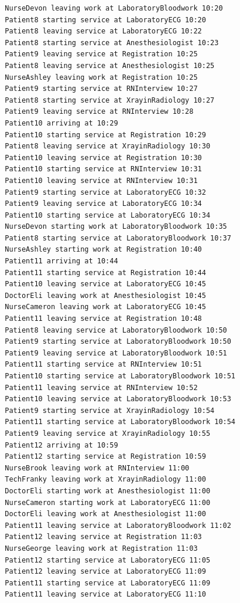\documentclass[12pt]{article}
\begin{document}
\begin{verbatim}
		NurseDevon leaving work at LaboratoryBloodwork 10:20
		Patient8 starting service at LaboratoryECG 10:20
		Patient8 leaving service at LaboratoryECG 10:22
		Patient8 starting service at Anesthesiologist 10:23
		Patient9 leaving service at Registration 10:25
		Patient8 leaving service at Anesthesiologist 10:25
		NurseAshley leaving work at Registration 10:25
		Patient9 starting service at RNInterview 10:27
		Patient8 starting service at XrayinRadiology 10:27
		Patient9 leaving service at RNInterview 10:28
		Patient10 arriving at 10:29
		Patient10 starting service at Registration 10:29
		Patient8 leaving service at XrayinRadiology 10:30
		Patient10 leaving service at Registration 10:30
		Patient10 starting service at RNInterview 10:31
		Patient10 leaving service at RNInterview 10:31
		Patient9 starting service at LaboratoryECG 10:32
		Patient9 leaving service at LaboratoryECG 10:34
		Patient10 starting service at LaboratoryECG 10:34
		NurseDevon starting work at LaboratoryBloodwork 10:35
		Patient8 starting service at LaboratoryBloodwork 10:37
		NurseAshley starting work at Registration 10:40
		Patient11 arriving at 10:44
		Patient11 starting service at Registration 10:44
		Patient10 leaving service at LaboratoryECG 10:45
		DoctorEli leaving work at Anesthesiologist 10:45
		NurseCameron leaving work at LaboratoryECG 10:45
		Patient11 leaving service at Registration 10:48
		Patient8 leaving service at LaboratoryBloodwork 10:50
		Patient9 starting service at LaboratoryBloodwork 10:50
		Patient9 leaving service at LaboratoryBloodwork 10:51
		Patient11 starting service at RNInterview 10:51
		Patient10 starting service at LaboratoryBloodwork 10:51
		Patient11 leaving service at RNInterview 10:52
		Patient10 leaving service at LaboratoryBloodwork 10:53
		Patient9 starting service at XrayinRadiology 10:54
		Patient11 starting service at LaboratoryBloodwork 10:54
		Patient9 leaving service at XrayinRadiology 10:55
		Patient12 arriving at 10:59
		Patient12 starting service at Registration 10:59
		NurseBrook leaving work at RNInterview 11:00
		TechFranky leaving work at XrayinRadiology 11:00
		DoctorEli starting work at Anesthesiologist 11:00
		NurseCameron starting work at LaboratoryECG 11:00
		DoctorEli leaving work at Anesthesiologist 11:00
		Patient11 leaving service at LaboratoryBloodwork 11:02
		Patient12 leaving service at Registration 11:03
		NurseGeorge leaving work at Registration 11:03
		Patient12 starting service at LaboratoryECG 11:05
		Patient12 leaving service at LaboratoryECG 11:09
		Patient11 starting service at LaboratoryECG 11:09
		Patient11 leaving service at LaboratoryECG 11:10

\end{verbatim}
\end{document}

